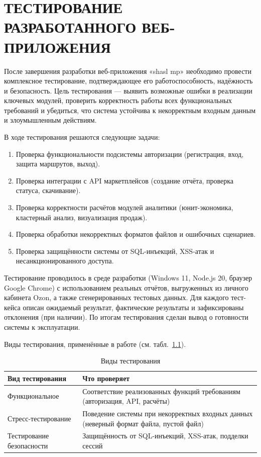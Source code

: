 \chapter{ТЕСТИРОВАНИЕ РАЗРАБОТАННОГО ВЕБ-ПРИЛОЖЕНИЯ}

После завершения разработки веб-приложения «shasl mp» необходимо провести комплексное тестирование, подтверждающее его работоспособность, надёжность и безопасность. Цель тестирования — выявить возможные ошибки в реализации ключевых модулей, проверить корректность работы всех функциональных требований и убедиться, что система устойчива к некорректным входным данным и злоумышленным действиям.

В ходе тестирования решаются следующие задачи:

\begin{enumerate}
\item Проверка функциональности подсистемы авторизации (регистрация, вход, защита маршрутов, выход).
\item Проверка интеграции с API маркетплейсов (создание отчёта, проверка статуса, скачивание).
\item Проверка корректности расчётов модулей аналитики (юнит-экономика, кластерный анализ, визуализация продаж).
\item Проверка обработки некорректных форматов файлов и ошибочных сценариев.
\item Проверка защищённости системы от SQL-инъекций, XSS-атак и несанкционированного доступа.
\end{enumerate}

Тестирование проводилось в среде разработки (Windows 11, Node.js 20, браузер Google Chrome) с использованием реальных отчётов, выгруженных из личного кабинета Ozon, а также сгенерированных тестовых данных. Для каждого тест-кейса описан ожидаемый результат, фактические результаты и зафиксированы отклонения (при наличии). По итогам тестирования сделан вывод о готовности системы к эксплуатации.

Виды тестирования, применённые в работе (см. табл.~\ref{tab:testing-types}).

\begin{table}[H]
\caption{Виды тестирования}
\label{tab:testing-types}
\begin{tabular}{|p{4.5cm}|p{10.5cm}|}
\hline
Вид тестирования & Что проверяет \\ \hline
Функциональное & Соответствие реализованных функций требованиям (авторизация, API, расчёты) \\ \hline
Стресс-тестирование & Поведение системы при некорректных входных данных (неверный формат файла, пустой файл) \\ \hline
Тестирование безопасности & Защищённость от SQL-инъекций, XSS-атак, подделки сессий \\ \hline
\end{tabular}
\end{table}

